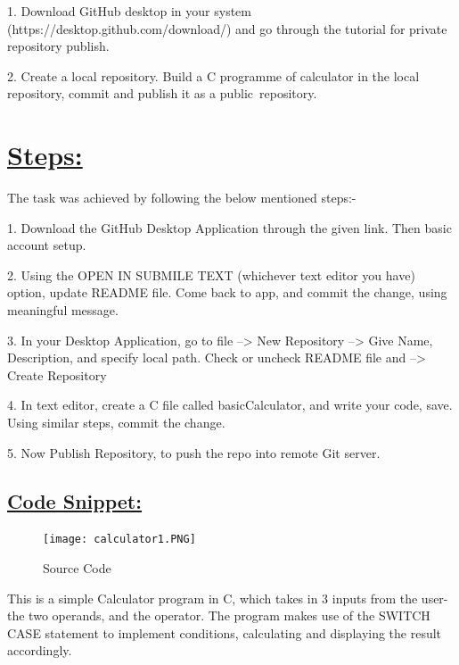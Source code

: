 \documentclass{article}
\begin{document}
1. Download GitHub desktop in your system (https://desktop.github.com/download/) and go through the tutorial for private repository publish. \vspace{0.2cm}
\newline

2. Create a local repository. Build a C programme of calculator in the local repository, commit and publish it as a public repository. \vspace{0.2cm}
\newline

\section{\underline{Steps:}}
The task was achieved by following the below mentioned steps:-
\newline

1. Download the GitHub Desktop Application through the given link. Then basic account setup. \vspace{0.5cm}

2. Using the OPEN IN SUBMILE TEXT (whichever text editor you have) option, update README file. Come back to app, and commit the change, using meaningful message. \vspace{0.5cm}

3. In your Desktop Application, go to file --> New Repository --> Give Name, Description, and specify local path. Check or uncheck README file and --> Create Repository \vspace{0.5cm}

4. In text editor, create a C file called basicCalculator, and write your code, save. Using similar steps, commit the change. \vspace{0.5cm}

5. Now Publish Repository, to push the repo into remote Git server. \vspace{0.5cm}

\newpage
\subsection{\underline{Code Snippet:}}

\begin{figure}[h!]
    \centering
    \texttt{[image: calculator1.PNG]}
    \caption{Source Code}
\end{figure}

\centering

\large This is a simple Calculator program in C, which takes in 3 inputs from the user- the two operands, and the operator. The program makes use of the SWITCH CASE statement to implement conditions, calculating and displaying the result accordingly.
\end{document}
